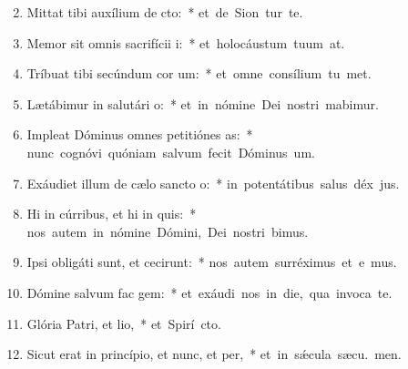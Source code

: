 \begin{flushleft}
\begin{enumerate}[leftmargin=*]
\setcounter{enumi}{1}

\item Mittat tibi auxílium de cto:~* \mbox{et de Sion tur te.}
\item Memor sit omnis sacrifícii i:~* \mbox{et holocáustum tuum  at.}
\item Tríbuat tibi secúndum cor um:~* \mbox{et omne consílium tu met.}
\item Lætábimur in salutári o:~* \mbox{et in nómine Dei nostri mabimur.}
\item Impleat Dóminus omnes petitiónes as:~* \mbox{nunc cognóvi quóniam salvum fecit Dóminus  um.}
\item Exáudiet illum de cælo sancto o:~* \mbox{in potentátibus salus déx jus.}
\item Hi in cúrribus, et hi in quis:~* \mbox{nos autem in nómine Dómini, Dei nostri bimus.}
\item Ipsi obligáti sunt, et cecirunt:~* \mbox{nos autem surréximus et e mus.}
\item Dómine salvum fac gem:~* \mbox{et exáudi nos in die, qua invoca te.}
\item Glória Patri, et lio,~* \mbox{et Spirí cto.}
\item Sicut erat in princípio, et nunc, et per,~* \mbox{et in s\'{\ae}cula sæcu. men.}

\end{enumerate}
\end{flushleft}

